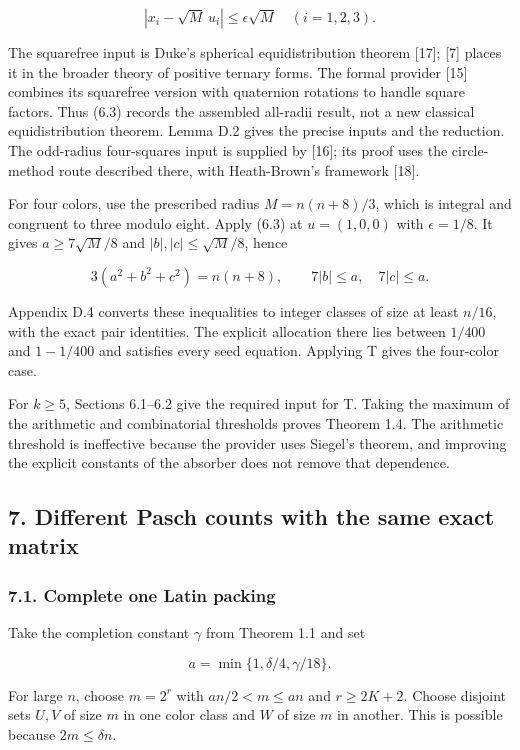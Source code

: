 \documentclass[english,11pt,a4paper]{article}
\begin{document}
\[|x_i-\sqrt M\,u_i|\le\epsilon\sqrt M\quad(i=1,2,3).\tag{6.3}\]

The squarefree input is Duke's spherical equidistribution theorem {[}17{]}; {[}7{]} places it in the broader theory of positive ternary forms. The formal provider {[}15{]} combines its squarefree version with quaternion rotations to handle square factors. Thus (6.3) records the assembled all-radii result, not a new classical equidistribution theorem. Lemma D.2 gives the precise inputs and the reduction. The odd-radius four-squares input is supplied by {[}16{]}; its proof uses the circle-method route described there, with Heath-Brown's framework {[}18{]}.

For four colors, use the prescribed radius \(M=n(n+8)/3\), which is integral and congruent to three modulo eight. Apply (6.3) at \(u=(1,0,0)\) with \(\epsilon=1/8\). It gives \(a\ge7\sqrt M/8\) and \(|b|,|c|\le\sqrt M/8\), hence

\[3(a^2+b^2+c^2)=n(n+8),\qquad 7|b|\le a,\quad7|c|\le a.\]

Appendix D.4 converts these inequalities to integer classes of size at least \(n/16\), with the exact pair identities. The explicit allocation there lies between \(1/400\) and \(1-1/400\) and satisfies every seed equation. Applying T gives the four-color case.

For \(k\ge5\), Sections 6.1--6.2 give the required input for T. Taking the maximum of the arithmetic and combinatorial thresholds proves Theorem 1.4. The arithmetic threshold is ineffective because the provider uses Siegel's theorem, and improving the explicit constants of the absorber does not remove that dependence.

\subsection{7. Different Pasch counts with the same exact matrix}\label{different-pasch-counts-with-the-same-exact-matrix}

\subsubsection{7.1. Complete one Latin packing}\label{complete-one-latin-packing}

Take the completion constant \(\gamma\) from Theorem 1.1 and set

\[a=\min\{1,\delta/4,\gamma/18\}.\]

For large \(n\), choose \(m=2^r\) with \(an/2<m\le an\) and \(r\ge2K+2\). Choose disjoint sets \(U,V\) of size \(m\) in one color class and \(W\) of size \(m\) in another. This is possible because \(2m\le\delta n\).
\end{document}
